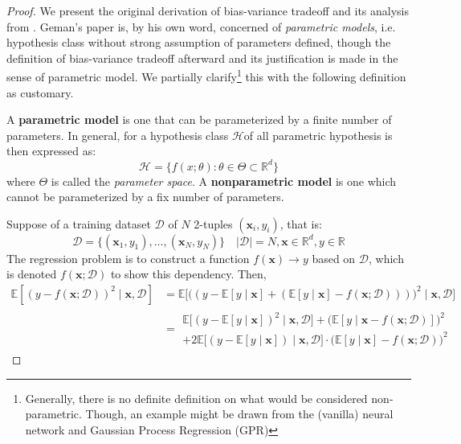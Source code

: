 \documentclass[10pt]{article}
\begin{document}
\begin{proof}
    We present the original derivation of bias-variance tradeoff and its analysis from \cite{6797087}. Geman's paper is, by his own word, concerned of \textit{parametric models}, i.e. hypothesis class without strong assumption of parameters defined, though the definition of bias-variance tradeoff afterward and its justification is made in the sense of parametric model. We partially clarify\footnote{Generally, there is no definite definition on what would be considered non-parametric. Though, an example might be drawn from the (vanilla) neural network and Gaussian Process Regression (GPR)} this with the following definition as customary. 

    \begin{definition}[Parameterization]
        A \textbf{parametric model} is one that can be parameterized by a finite number of parameters. In general, for a hypothesis class $\mathcal{H}$of all parametric hypothesis is then expressed as:
        \begin{equation}
            \mathcal{H} = \{f(x;\theta): \theta \in \Theta \subset \mathbb{R}^{d}\}
        \end{equation} where $\Theta$ is called the \textit{parameter space}. A \textbf{nonparametric model} is one which cannot be parameterized by a fix number of parameters.   
    \end{definition}
    Suppose of a training dataset $\mathcal{D}$ of $N$ 2-tuples $(\mathbf{x}_{i},y_{i})$, that is: \begin{equation}
        \mathcal{D} = \{(\mathbf{x}_{1},y_{1}),\dots,(\mathbf{x}_{N},y_{N})\} \quad \lvert \mathcal{D} \rvert = N, \mathbf{x}\in \mathbb{R}^{d}, y \in \mathbb{R}
    \end{equation}
    The regression problem is to construct a function $f(\mathbf{x})\to y$ based on $\mathcal{D}$, which is denoted $f(\mathbf{x};\mathcal{D})$ to show this dependency. Then, 
    \begin{equation}
        \begin{split}
            \mathbb{E}\left[ (y-f(\mathbf{x};\mathcal{D}))^{2}\mid \mathbf{x},\mathcal{D}\right] & = \mathbb{E}\Big[\big( (y-\mathbb{E}[y\mid \mathbf{x}]+ (\mathbb{E}[y\mid \mathbf{x}]-f(\mathbf{x};\mathcal{D}))) \big)^{2}\mid \mathbf{x},\mathcal{D}\Big]\\
            & = \begin{multlined}
                \mathbb{E} \Big[ (y- \mathbb{E}[y\mid \mathbf{x}])^{2}\mid \mathbf{x},\mathcal{D} \Big] + \Big(\mathbb{E}[y\mid \mathbf{x}-f(\mathbf{x};\mathcal{D})]\Big)^{2} \\ + 2\mathbb{E} \big[(y-\mathbb{E}[y\mid \mathbf{x}])\mid \mathbf{x},\mathcal{D}\big]\cdot \big(\mathbb{E}[y\mid \mathbf{x}]-f(\mathbf{x;\mathcal{D}})\big)^{2} 

\end{multlined}
\end{split}
\end{equation}
\end{proof}
\end{document}
